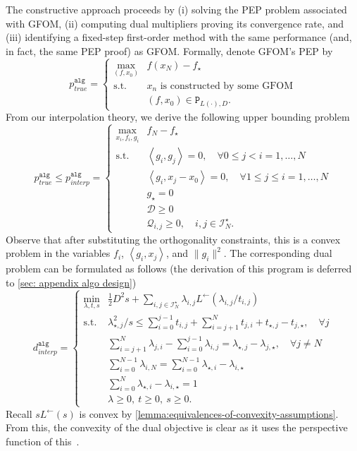 \documentclass[11pt, hidelinks]{article}
\numberwithin{equation}{section}
\theoremstyle{thmstyletwo}%
\numberwithin{equation}{section}
\newcommand{\inner}[2]{\left\langle {#1}, {#2} \right\rangle}
\newcommand{\Lleft}{L^{\leftarrow}}
\newcommand{\pAlg}{p^\mathtt{alg}}
\newcommand{\dAlg}{d^\mathtt{alg}}
\begin{document}
The constructive approach proceeds by (i) solving the PEP problem associated with GFOM, (ii) computing dual multipliers proving its convergence rate, and (iii) identifying a fixed-step first-order method with the same performance (and, in fact, the same PEP proof) as GFOM. Formally, denote GFOM's PEP by
\begin{equation}\label{constructive_approach_PEP_true}\pAlg_{true} = \begin{cases} \max_{(f,x_0)} & f(x_N)-f_\star\\ 
   \mathrm{s.t.}  & x_n \text{ is constructed by some GFOM}\\
   & (f,x_0) \in  \mathtt{P}_{L(\cdot), D}.
    \end{cases}\end{equation}
From our interpolation theory, we derive the following upper bounding problem
\begin{equation}\label{constructive_approach_PEP}
\pAlg_{true} \leq \pAlg_{interp} = \begin{cases} \max_{x_i, f_i, g_i} & f_N-f_\star\\ 
   \mathrm{s.t.}&   \inner{g_i}{g_j} = 0, \quad \forall 0 \leq j < i = 1, \dots, N\\
& \inner{g_i}{x_j-x_0} = 0, \quad \forall 1\leq j\leq i = 1,\dots, N\\
& g_\star = 0\\
& \mathcal{D} \geq 0\\
 & \mathcal{Q}_{i,j}\geq 0, \quad i,j \in \mathcal{I}_N^\star.
    \end{cases}\end{equation}
Observe that after substituting the orthogonality constraints, this is a convex problem in the variables $f_i$, $\inner{g_i}{x_j}$, and $\|g_i\|^2$. The corresponding dual problem can be formulated as follows (the derivation of this program is deferred to \cref{sec: appendix algo design})
\begin{equation}\label{upper_triangular_dual_pep}\dAlg_{interp} = \begin{cases} \min_{\lambda, {t}, s}
   & {\frac{1}{2}D^2s + \sum_{i,j \in \mathcal{I}_N^\star} \lambda_{i,j }\Lleft(\lambda_{i,j}/ t_{i,j})}\\
    \mathrm{s.t.} & \lambda_{\star,j}^2/s \leq  \sum_{i=0}^{j-1}   t_{i,j}+ \sum_{i=j+1}^N  t_{j,i} +  t_{\star,j} -t_{j,\star} , \quad  \forall j\\
    &\sum_{i=j+1}^N \lambda_{j,i} - \sum_{i=0}^{j-1} \lambda_{i,j}  = \lambda_{\star,j}-\lambda_{j,\star}, \quad \forall j \ne N\\
    &
    \sum_{i=0}^{N-1}\lambda_{i,N} = \sum_{i=0}^{N-1}\lambda_{\star,i}-\lambda_{i,\star}\\
    & \sum_{i=0}^N \lambda_{\star,i} -\lambda_{i,\star} = 1\\
   &  \lambda \geq 0, \  t \geq 0, \ s \geq 0.
\end{cases}\end{equation}
Recall $s \Lleft(s)$ is convex by \cref{lemma:equivalences-of-convexity-assumptions}. From this, the convexity of the dual objective is clear as it uses the perspective function of this~\cite[Section 3.2.6]{boyd2004convex}.
\end{document}
